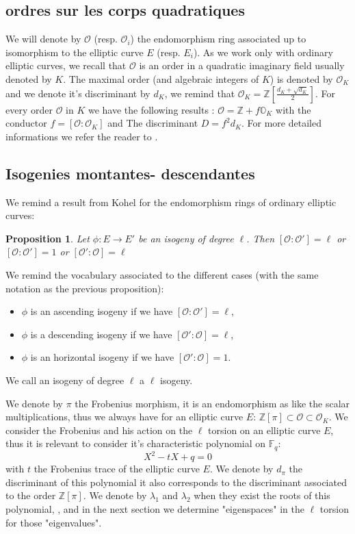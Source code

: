 \documentclass{article}
\theoremstyle{plain}
\newtheorem{prop}[thm]{Proposition}
\theoremstyle{definition}
\theoremstyle{remark}
\begin{document}
\subsection{ordres sur les corps quadratiques}%
We will denote by $\mathcal{O}$ (resp. $\mathcal{O}_i$) the endomorphism ring associated up to isomorphism to the elliptic curve $E$ (resp. $E_i$). As we work only with ordinary elliptic curves, we recall that $\mathcal{O}$ is an order in a quadratic imaginary field usually denoted by $K$. The maximal order (and algebraic integers of $K$) is denoted by $\mathcal{O}_K$ and we denote it's discriminant by $d_K$, we remind that $\mathcal{O}_K=\mathbb{Z}[\frac{d_K+\sqrt{d_K}}{2}]$. For every order $\mathcal{O}$ in $K$ we have the following results : $\mathcal{O}= \mathbb{Z}+ f \mathbb{O}_K$ with the conductor $f=[\mathcal{O}:\mathcal{O}_K]$ and The discriminant $D=f^2d_K$. For more detailed informations we refer the reader to \cite{Cox89}.

\subsection{Isogenies montantes- descendantes}
We remind a result from Kohel \cite{Kohel} for the endomorphism rings of ordinary elliptic curves:
\begin{prop}
Let $\phi:E \rightarrow E'$ be an isogeny of degree $\ell$. Then $[\mathcal{O}:\mathcal{O'}]=\ell$ or $[\mathcal{O}:\mathcal{O'}]=1$ or $[\mathcal{O'}:\mathcal{O}]=\ell$
\end{prop}
We remind the vocabulary associated to the different cases (with the same notation as the previous proposition):
\begin{itemize}
\item $\phi$ is an ascending isogeny if we have $[\mathcal{O}:\mathcal{O'}]=\ell$,
\item $\phi$ is a descending isogeny if we have $[\mathcal{O'}:\mathcal{O}]=\ell$,
\item $\phi$ is an horizontal isogeny if we have $[\mathcal{O'}:\mathcal{O}]=1$.
\end{itemize}
We call an isogeny of degree $\ell$ a $\ell$ isogeny.

We denote by $\pi$ the Frobenius morphism, it is an endomorphism as like the scalar multiplications, thus we always have for an elliptic curve $E$:
$\mathbb{Z}[\pi] \subset \mathcal{O} \subset \mathcal{O}_K$.
We consider the Frobenius and his action on the $\ell$ torsion on an elliptic curve $E$, thus it is relevant to consider it's characteristic polynomial on $\mathbb{F}_q$:
\begin{equation}
X^2 - tX +q = 0
\end{equation}
with $t$ the Frobenius trace of the elliptic curve $E$. We denote by $d_{\pi}$ the discriminant of this polynomial it also corresponds to the discriminant associated to the order $\mathbb{Z}[\pi]$. We denote by $\lambda_1$ and $\lambda_2$ when they exist the roots of this polynomial, , and in the next section we  determine "eigenspaces" in the $\ell$ torsion for those "eigenvalues".
\end{document}
